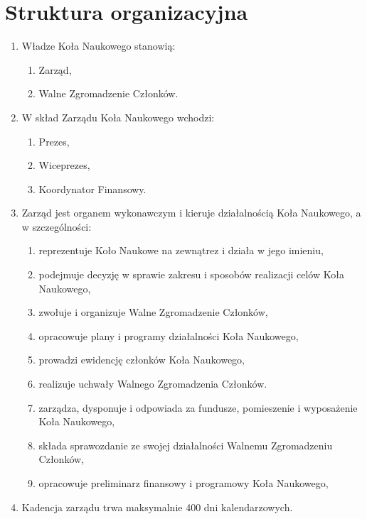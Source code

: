 \documentclass[12pt,a4paper]{article}
\begin{document}
    \section{Struktura organizacyjna}
    \begin{enumerate}
        \item Władze Koła Naukowego stanowią:
            \begin{enumerate}
                \item Zarząd,
                \item Walne Zgromadzenie Członków.
            \end{enumerate}
        \item W skład Zarządu Koła Naukowego wchodzi:
            \begin{enumerate}
                \item Prezes,
                \item Wiceprezes,
                \item Koordynator Finansowy.
            \end{enumerate}
        \item Zarząd jest organem wykonawczym i kieruje działalnością Koła Naukowego, a w szczególności:
            \begin{enumerate}
                \item reprezentuje Koło Naukowe na zewnątrez i działa w jego imieniu,
                \item podejmuje decyzję w sprawie zakresu i sposobów realizacji celów Koła Naukowego,
                \item zwołuje i organizuje Walne Zgromadzenie Członków,
                \item opracowuje plany i programy działalności Koła Naukowego,
                \item prowadzi ewidencję członków Koła Naukowego,
                \item realizuje uchwały Walnego Zgromadzenia Członków.
                \item zarządza, dysponuje i odpowiada za fundusze, pomieszenie i wyposażenie Koła Naukowego,
                \item składa sprawozdanie ze swojej działalności Walnemu Zgromadzeniu Członków,
                \item opracowuje preliminarz finansowy i programowy Koła Naukowego,
            \end{enumerate}
        \item Kadencja zarządu trwa maksymalnie 400 dni kalendarzowych.

\end{enumerate}
\end{document}
